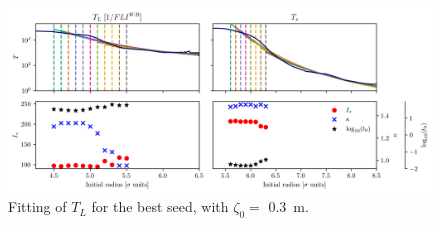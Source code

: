 \begin{figure}
    \centering
    \includegraphics[width=1\textwidth]{6_lhc_dynamic_indicators/figs/fit_l_time_best.png}
    \caption{Fitting of $T_L$ for the best seed, with $\zeta_0=$ \SI{0.3}{\meter}.}
\end{figure}


